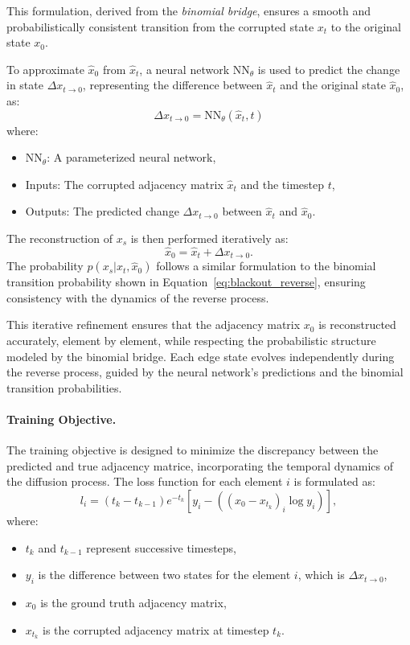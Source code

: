 This formulation, derived from the \textit{binomial bridge}, ensures a smooth and probabilistically consistent transition from the corrupted state \( x_t \) to the original state \( x_0 \).

To approximate \( \hat{x}_0 \) from \( \hat{x}_t \), a neural network \(\text{NN}_\theta\) is used to predict the change in state \(\Delta x_{t \to 0}\), representing the difference between \( \hat{x}_t \) and the original state \( \hat{x}_0 \), as:
\[
\Delta x_{t \to 0} = \text{NN}_\theta(\hat{x}_t, t)
\]
where:
\begin{itemize}
    \item \( \text{NN}_\theta \): A parameterized neural network,
    \item Inputs: The corrupted adjacency matrix \( \hat{x}_t \) and the timestep \( t \),
    \item Outputs: The predicted change \(\Delta x_{t \to 0}\) between \( \hat{x}_t \) and \( \hat{x}_0 \).
\end{itemize}

The reconstruction of \( x_s \) is then performed iteratively as:
\[
\hat{x}_0 = \hat{x}_t + \Delta x_{t \to 0}.
\]
The probability \( p(x_{s} | \hat{x}_t, \hat{x}_0) \) follows a similar formulation to the binomial transition probability shown in Equation~\ref{eq:blackout_reverse}, ensuring consistency with the dynamics of the reverse process.

This iterative refinement ensures that the adjacency matrix \( x_0 \) is reconstructed accurately, element by element, while respecting the probabilistic structure modeled by the binomial bridge. Each edge state evolves independently during the reverse process, guided by the neural network's predictions and the binomial transition probabilities.

\paragraph{Training Objective.}  
The training objective is designed to minimize the discrepancy between the predicted and true adjacency matrice, incorporating the temporal dynamics of the diffusion process. The loss function for each element \(i\) is formulated as:
\begin{equation}
l_i = (t_k - t_{k-1}) e^{-t_k} \left[ y_i - \left( (x_0 - x_{t_k})_i \log y_i \right) \right],
\label{eq:training_objective}
\end{equation}
where:
\begin{itemize}
    \item \(t_k\) and \(t_{k-1}\) represent successive timesteps,
    \item \(y_i\) is the difference between two states for the element \(i\), which is \(\Delta x_{t \to 0}\),
    \item \(x_0\) is the ground truth adjacency matrix,
    \item \(x_{t_k}\) is the corrupted adjacency matrix at timestep \(t_k\).
\end{itemize}

